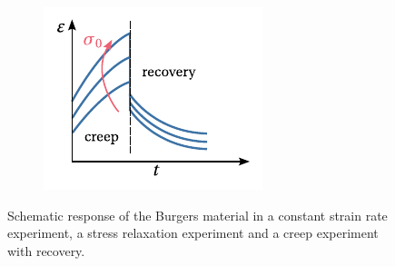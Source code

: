 \begin{figure}
\begin{subfigure}[b]{0.30\textwidth}
            \caption{}
            \label{subfig:burgers_stress_relax}
    \end{subfigure}
    \hfill
    \begin{subfigure}[b]{0.30\textwidth}
      \centering
      \includegraphics[width=\textwidth]{figures/burgers_creep_plus_recov}
      \caption{}
      \label{subfig:burgers_creep_plus_recov}
    \end{subfigure}
  \caption{Schematic response of the Burgers material in  a constant strain rate experiment,  a stress relaxation experiment and a  creep experiment with recovery.}
\label{fig:burgers_mat_res}
\end{figure}


